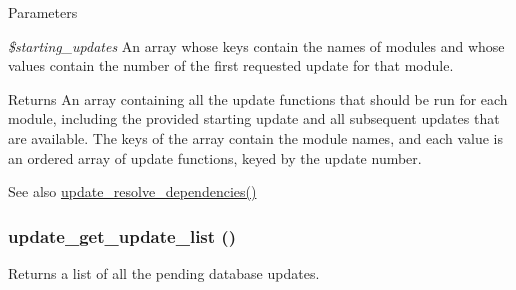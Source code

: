 \begin{DoxyParams}{Parameters}
\item[{\em \$starting\_\-updates}]An array whose keys contain the names of modules and whose values contain the number of the first requested update for that module.\end{DoxyParams}
\begin{DoxyReturn}{Returns}
An array containing all the update functions that should be run for each module, including the provided starting update and all subsequent updates that are available. The keys of the array contain the module names, and each value is an ordered array of update functions, keyed by the update number.
\end{DoxyReturn}
\begin{DoxySeeAlso}{See also}
\hyperlink{update_8inc_aa931d6cdddc2e9e0ec96d240523056e9}{update\_\-resolve\_\-dependencies()} 
\end{DoxySeeAlso}
\hypertarget{update_8inc_ae95fb5ec58e85fd5c10c56345fd7cabe}{
\subsubsection[{update\_\-get\_\-update\_\-list}]{\setlength{\rightskip}{0pt plus 5cm}update\_\-get\_\-update\_\-list ()}}
\label{update_8inc_ae95fb5ec58e85fd5c10c56345fd7cabe}
Returns a list of all the pending database updates.

